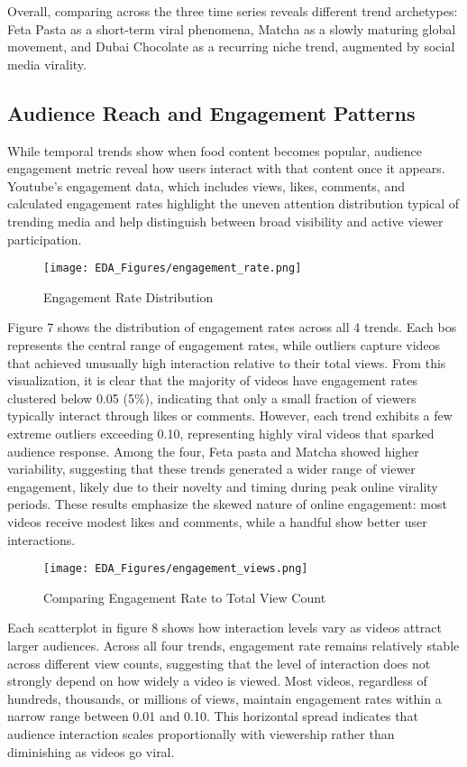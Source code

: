 \documentclass{article}
\begin{document}
Overall, comparing across the three time series reveals different trend archetypes: Feta Pasta as a short-term viral phenomena, Matcha as a slowly maturing global movement, and Dubai Chocolate as a recurring niche trend, augmented by social media virality.

\subsection{Audience Reach and Engagement Patterns}
While temporal trends show when food content becomes popular, audience engagement metric reveal how users interact with that content once it appears. Youtube's engagement data, which includes views, likes, comments, and calculated engagement rates highlight the uneven attention distribution typical of trending media and help distinguish between broad visibility and active viewer participation. 

\begin{figure}[H]
    \centering
    \texttt{[image: EDA\_Figures/engagement\_rate.png]}
    \caption{Engagement Rate Distribution}
    \label{fig:engagement_rate}
\end{figure}

Figure 7 shows the distribution of engagement rates across all 4 trends. Each bos represents the central range of engagement rates, while outliers capture videos that achieved unusually high interaction relative to their total views. From this visualization, it is clear that the majority of videos have engagement rates clustered below 0.05 (5\%), indicating that only a small fraction of viewers typically interact through likes or comments. However, each trend exhibits a few extreme outliers exceeding 0.10, representing highly viral videos that sparked audience response. Among the four, Feta pasta and Matcha showed higher variability, suggesting that these trends generated a wider range of viewer engagement, likely due to their novelty and timing during peak online virality periods. These results emphasize the skewed nature of online engagement: most videos receive modest likes and comments, while a handful show better user interactions.

\begin{figure}[H]
    \centering
    \texttt{[image: EDA\_Figures/engagement\_views.png]}
    \caption{Comparing Engagement Rate to Total View Count}
    \label{fig:engagement_views}
\end{figure}

Each scatterplot in figure 8 shows how interaction levels vary as videos attract larger audiences. Across all four trends, engagement rate remains relatively stable across different view counts, suggesting that the level of interaction does not strongly depend on how widely a video is viewed. Most videos, regardless of hundreds, thousands, or millions of views, maintain engagement rates within a narrow range between 0.01 and 0.10. This horizontal spread indicates that audience interaction scales proportionally with viewership rather than diminishing as videos go viral. 
\end{document}
